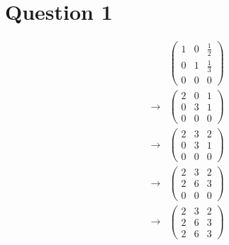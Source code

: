 \section*{Question 1}
\begin{eqnarray*}
  & & \left(
        \begin{array}{ccc}
          1 & 0 & \frac{1}{2} \\
          0 & 1 & \frac{1}{3} \\
          0 & 0 & 0 
        \end{array}
      \right) \\
  & \to &
    \left(
        \begin{array}{ccc}
          2 & 0 & 1 \\
          0 & 3 & 1 \\
          0 & 0 & 0 
        \end{array}
    \right) \\
  & \to &
    \left(
        \begin{array}{ccc}
          2 & 3 & 2 \\
          0 & 3 & 1 \\
          0 & 0 & 0 
        \end{array}
    \right) \\
  & \to &
    \left(
        \begin{array}{ccc}
          2 & 3 & 2 \\
          2 & 6 & 3 \\
          0 & 0 & 0 
        \end{array}
    \right) \\       
  & \to &
    \left(
        \begin{array}{ccc}
          2 & 3 & 2 \\
          2 & 6 & 3 \\
          2 & 6 & 3
        \end{array}
    \right) \\           
\end{eqnarray*}
